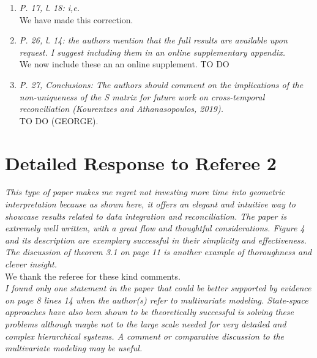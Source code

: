 \documentclass[a4paper,11pt]{article}
\begin{document}
\begin{enumerate}
	    \item \textit{P. 17, l. 18: i,e.}\\
	    We have made this correction.\\
	    
	    \item \textit{P. 26, l. 14: the authors mention that the full results are available upon request. I suggest including them in an online supplementary appendix.}\\
	    We now include these an an online supplement. TO DO\\
	    
	    \item \textit{P. 27, Conclusions: The authors should comment on the implications of the non-uniqueness of the S matrix for future work on cross-temporal reconciliation (Kourentzes and Athanasopoulos, 2019).}\\
	    TO DO (GEORGE).\\
	    
    \end{enumerate}

    \section*{Detailed Response to Referee 2}

	\noindent \textit{This type of paper makes me regret not investing more time into geometric interpretation because as shown here, it offers an elegant and intuitive way to showcase results related to data integration and reconciliation. The paper is extremely well written, with a great flow and thoughtful considerations. Figure 4 and its description are exemplary successful in their simplicity and effectiveness. The discussion of theorem 3.1 on page 11 is another example of thoroughness and clever insight.}\\
	
	\noindent We thank the referee for these kind comments.\\
	
    \noindent\textit{I found only one statement in the paper that could be better supported by evidence on page 8 lines 14 when the author(s) refer to multivariate modeling. State-space approaches have also been shown to be theoretically successful is solving these problems although maybe not to the large scale needed for very detailed and complex hierarchical systems. A comment or comparative discussion to the multivariate modeling may be useful.}\\
    
\end{document}
